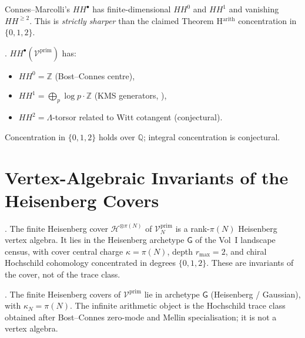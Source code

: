 \begin{observation}
\label{v4-arith:obs:CM-stricter-than-H-arith}
Connes--Marcolli's \(HH^{\bullet}\) has finite-dimensional
\(HH^{0}\) and \(HH^{1}\) and vanishing \(HH^{\geq 2}\). This is
\emph{strictly sharper} than the claimed Theorem H\(^{\mathrm{arith}}\)
concentration in \(\{0,1,2\}\).
\end{observation}

\begin{theorem}
\label{v4-arith:thm:H-arith-corrected}
\ClaimStatusConjectured. \(HH^{\bullet}(\mathcal{V}^{\mathrm{prim}})\) has:
\begin{itemize}
\item \(HH^{0}=\mathbb{Z}\) (Bost--Connes centre),
\item \(HH^{1}=\bigoplus_{p}\log p\cdot\mathbb{Z}\) (KMS
generators, ),
\item \(HH^{2}=\Lambda\)-torsor related to Witt cotangent
(conjectural).
\end{itemize}
Concentration in \(\{0,1,2\}\) holds over \(\mathbb{Q}\); integral
concentration is conjectural.
\end{theorem}

\section{Vertex-Algebraic Invariants of the Heisenberg Covers}
\label{v4-arith:cs:new-content}

\begin{theorem}
\label{v4-arith:thm:universal-non-arithmetic}
\ClaimStatusProvedHere. The finite Heisenberg cover
\(\mathcal{H}^{\otimes \pi(N)}\) of
\(\mathcal{V}^{\mathrm{prim}}_{N}\) is a rank-\(\pi(N)\) Heisenberg
vertex algebra. It lies in the Heisenberg archetype \(\mathsf{G}\) of
the Vol~I landscape census, with cover central charge
\(\kappa=\pi(N)\), depth \(r_{\max}=2\), and chiral Hochschild
cohomology concentrated in degrees \(\{0,1,2\}\). These are invariants
of the cover, not of the trace class.
\end{theorem}

\begin{corollary}
\label{v4-arith:cor:placement-G-archetype}
\ClaimStatusProvedHere. The finite Heisenberg covers of
\(\mathcal{V}^{\mathrm{prim}}\) lie in archetype \(\mathsf{G}\)
(Heisenberg / Gaussian), with \(\kappa_{N}=\pi(N)\). The infinite
arithmetic object is the Hochschild trace class obtained after
Bost--Connes zero-mode and Mellin specialisation; it is not a vertex
algebra.
\end{corollary}

